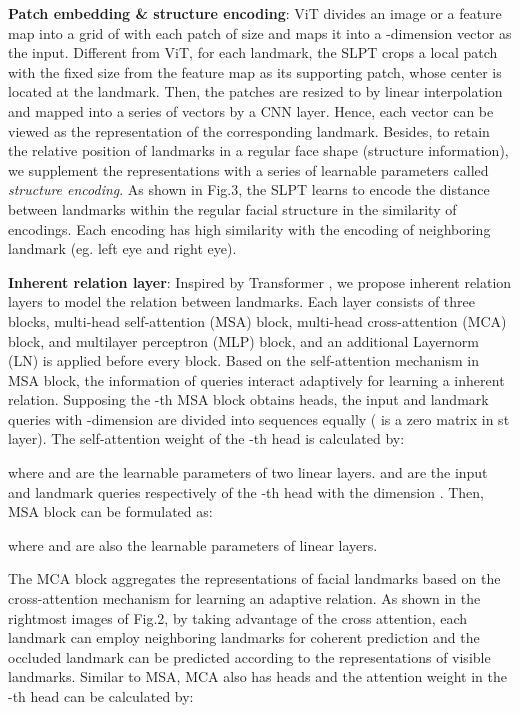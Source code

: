 \documentclass[10pt,twocolumn,letterpaper]{article}
\begin{document}
\textbf{Patch embedding \& structure encoding}: ViT \cite{VIT} divides an image or a feature map  into a grid of  with each patch of size  and maps it into a -dimension vector as the input. Different from ViT, for each landmark, the SLPT crops a local patch with the fixed size  from the feature map as its supporting patch, whose center is located at the landmark. Then, the patches are resized to  by linear interpolation and mapped into a series of vectors by a CNN layer. Hence, each vector can be viewed as the representation of the corresponding landmark. Besides, to retain the relative position of landmarks in a regular face shape (structure information), we supplement the representations with a series of learnable parameters called \textit{structure encoding}. As shown in Fig.3, the SLPT learns to encode the distance between landmarks within the regular facial structure in the similarity of encodings. Each encoding has high similarity with the encoding of neighboring landmark (eg. left eye and right eye).




\textbf{Inherent relation layer}: Inspired by Transformer \cite{Transformer}, we propose inherent relation layers to model the relation between landmarks. Each layer consists of three blocks, multi-head self-attention (MSA) block, multi-head cross-attention (MCA) block, and multilayer perceptron (MLP) block, and an additional Layernorm (LN) is applied before every block. Based on the self-attention mechanism in MSA block, the information of queries interact adaptively for learning a  inherent relation. Supposing the -th MSA block obtains  heads, the input  and landmark queries  with -dimension are divided into  sequences equally ( is a zero matrix in st layer). The self-attention weight of the -th head  is calculated by:

where  and   are the learnable parameters of two linear layers.  and  are the input and landmark queries respectively of the -th head with the dimension . Then, MSA block can be formulated as:

where  and  are also the learnable parameters of linear layers. 

The MCA block aggregates the representations of facial landmarks based on the cross-attention mechanism for learning an adaptive  relation. As shown in the rightmost images of Fig.2, by taking advantage of the cross attention, each landmark can employ neighboring landmarks for coherent prediction and the occluded landmark can be predicted according to the representations of visible landmarks. Similar to MSA, MCA also has  heads and the attention weight in the -th head  can be calculated by:
\end{document}
